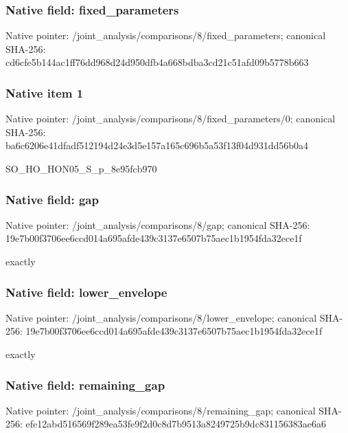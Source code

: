 \documentclass[10pt,a4paper]{article}
\begin{document}
\subsubsection{Native field: fixed\_\allowbreak{}parameters}
Native pointer: /joint\_\allowbreak{}analysis/comparisons/8/fixed\_\allowbreak{}parameters; canonical SHA-256: cd6cfe5b144ac1ff76dd968d24d950dfb4a668bdba3cd21c51afd09b5778b663

\subsubsection{Native item 1}
Native pointer: /joint\_\allowbreak{}analysis/comparisons/8/fixed\_\allowbreak{}parameters/0; canonical SHA-256: ba6c6206e41dfadf512194d24e3d5e157a165c696b5a53f13f04d931dd56b0a4

\begingroup\raggedright\sloppy SO\_\allowbreak{}HO\_\allowbreak{}HON05\_\allowbreak{}S\_\allowbreak{}p\_\allowbreak{}8e95fcb970\par\endgroup

\subsubsection{Native field: gap}
Native pointer: /joint\_\allowbreak{}analysis/comparisons/8/gap; canonical SHA-256: 19e7b00f3706ee6ccd014a695afde439c3137e6507b75aec1b1954fda32ece1f

\begingroup\raggedright{} exactly\par\endgroup

\subsubsection{Native field: lower\_\allowbreak{}envelope}
Native pointer: /joint\_\allowbreak{}analysis/comparisons/8/lower\_\allowbreak{}envelope; canonical SHA-256: 19e7b00f3706ee6ccd014a695afde439c3137e6507b75aec1b1954fda32ece1f

\begingroup\raggedright{} exactly\par\endgroup

\subsubsection{Native field: remaining\_\allowbreak{}gap}
Native pointer: /joint\_\allowbreak{}analysis/comparisons/8/remaining\_\allowbreak{}gap; canonical SHA-256: efe12abd516569f289ea53fe9f2d0c8d7b9513a8249725b9dc831156383ae6a6
\end{document}
